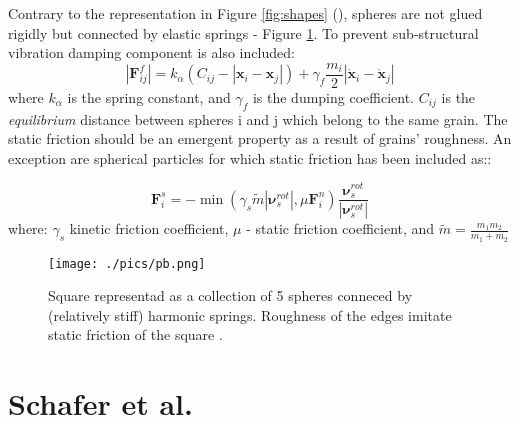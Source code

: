 \documentclass[10pt,a4paper]{article}
\begin{document}
Contrary to the representation in Figure \ref{fig:shapes} (\cite{sok93}), spheres are not glued rigidly but connected by elastic springs - Figure \ref{fig:pb}.
To prevent sub-structural vibration damping component is also included:
\begin{equation}
 |\mathbf{F}^{f}_{ij}| =k_\alpha \left(C_{ij} -  |\mathbf{x}_{i} - \mathbf{x}_j| \right) + \gamma_{f} \frac{m_i}{2} |\dot{\mathbf{x}}_{i} - \dot{\mathbf{x}}_j|
\end{equation}
where $k_\alpha$ is the spring constant, and $\gamma_{f}$ is the dumping coefficient. $C_{ij}$ is the \textit{equilibrium} distance between spheres i and j
which belong to the same grain.
The static friction should be an emergent property as a result of grains' roughness. 
An exception are spherical particles for which static friction has been included as:\cite{cs79, herr93, herr94}:
 
\begin{equation}
\mathbf{F}^{s}_{i} = - \min(\gamma_{s} \tilde{m} |\mathbf{\nu}^{rot}_s| , \mu \mathbf{F}^{n}_{i} ) \frac{\mathbf{\nu}^{rot}_s}{|\mathbf{\nu}^{rot}_s|}
\end{equation}
where:
$\gamma_s$ kinetic friction coefficient, $\mu$ - static friction coefficient, and $\tilde{m} = \frac{m_1m_2}{m_1+m_2}$



\begin{figure}[tb]
\centering
\texttt{[image: ./pics/pb.png]}
\caption{Square representad as a collection of 5 spheres conneced by (relatively stiff) harmonic springs. Roughness of the edges imitate static friction of the square \cite{pb93}.}
\label{fig:pb}
\end{figure}

\section{Schafer et al. \cite{sw95, schafer96}}
\end{document}
